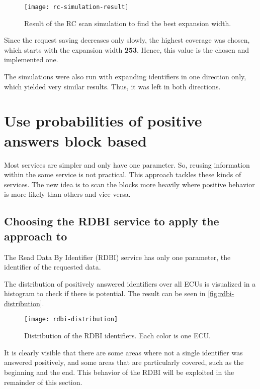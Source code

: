 \begin{figure}[htb]
    \centering
    \texttt{[image: rc-simulation-result]}
    \caption{Result of the RC scan simulation to find the best expansion width.}
    \label{fig:rc-simulation-result}
\end{figure}

Since the request saving decreases only slowly, the highest coverage was chosen, which starts with the expansion width \textbf{253}. Hence, this value is the chosen and implemented one.

The simulations were also run with expanding identifiers in one direction only, which yielded very similar results. Thus, it was left in both directions.


\section{Use probabilities of positive answers block based}

Most services are simpler and only have one parameter. So, reusing information within the same service is not practical. This approach tackles these kinds of services. The new idea is to scan the blocks more heavily where positive behavior is more likely than others and vice versa.

\subsection{Choosing the RDBI service to apply the approach to}

The Read Data By Identifier (RDBI) service has only one parameter, the identifier of the requested data.

The distribution of positively answered identifiers over all ECUs is visualized in a histogram to check if there is potential. The result can be seen in \autoref{fig:rdbi-distribution}.

\begin{figure}[htb]
    \centering
    \texttt{[image: rdbi-distribution]}
    \caption{Distribution of the RDBI identifiers. Each color is one ECU.}
    \label{fig:rdbi-distribution}
\end{figure}

It is clearly visible that there are some areas where not a single identifier was answered positively, and some areas that are particularly covered, such as the beginning and the end. This behavior of the RDBI will be exploited in the remainder of this section.

